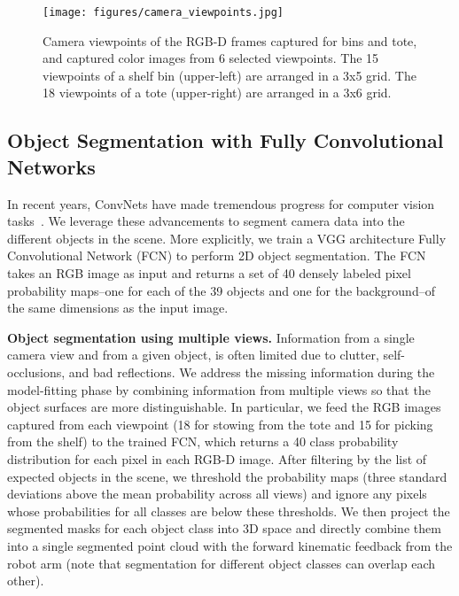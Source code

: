 \documentclass[letterpaper, 10 pt, conference]{ieeeconf}  %
\newcommand{\myparagraph}[1]{\vspace{0.1in}\noindent\textbf{#1}}
\begin{document}
\begin{figure}[t]
\vspace{2mm}
\centering
  \texttt{[image: figures/camera\_viewpoints.jpg]}
  \caption{Camera viewpoints of the RGB-D frames captured for bins and tote, and captured color images from 6 selected viewpoints. The 15 viewpoints of a shelf bin (upper-left) are arranged in a 3x5 grid. The 18 viewpoints of a tote (upper-right) are arranged in a 3x6 grid.}
  \label{fig:viewpoint}
  \vspace{-5mm}
\end{figure}



\subsection{Object Segmentation with Fully Convolutional Networks}
In recent years, ConvNets have made tremendous progress for computer vision tasks~\cite{girshick2014rich,long2015fully}. We leverage these advancements to segment camera data into the different objects in the scene. More explicitly, we train a VGG architecture \cite{simonyan2014very} Fully Convolutional Network (FCN) \cite{long2015fully} to perform 2D object segmentation. The FCN takes an RGB image as input and returns a set of 40 densely labeled pixel probability maps--one for each of the 39 objects and one for the background--of the same dimensions as the input image.


\myparagraph{Object segmentation using multiple views.}
Information from a single camera view and from a given object, is often limited due to clutter, self-occlusions, and bad reflections. We address the missing information during the model-fitting phase by combining information from multiple views so that the object surfaces are more distinguishable.
In particular, we feed the RGB images captured from each viewpoint (18 for stowing from the tote and 15 for picking from the shelf) to the trained FCN, which returns a 40 class probability distribution for each pixel in each RGB-D image. 
After filtering by the list of expected objects in the scene, we threshold the probability maps (three standard deviations above the mean probability across all views) and ignore any pixels whose probabilities for all classes are below these thresholds. 
We then project the segmented masks for each object class into 3D space 
and directly combine them into a single segmented point cloud with the forward kinematic feedback from the robot arm (note that segmentation for different object classes can overlap each other). %
\end{document}

